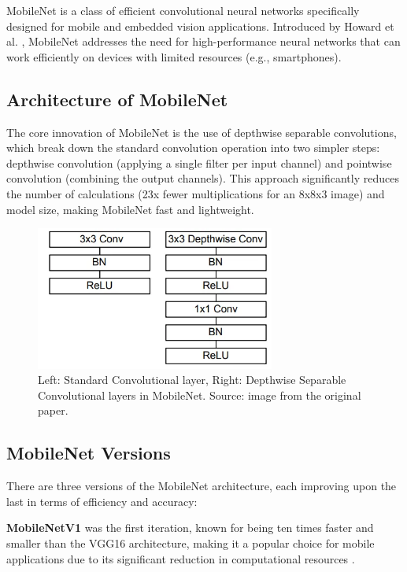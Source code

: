 MobileNet is a class of efficient convolutional neural networks specifically designed for mobile and embedded vision applications. Introduced by Howard et al. \cite{howard_mobilenet}, MobileNet addresses the need for high-performance neural networks that can work efficiently on devices with limited resources (e.g., smartphones).

\subsection{Architecture of MobileNet}

The core innovation of MobileNet is the use of depthwise separable convolutions, which break down the standard convolution operation into two simpler steps: depthwise convolution (applying a single filter per input channel) and pointwise convolution (combining the output channels). This approach significantly reduces the number of calculations (23x fewer multiplications for an 8x8x3 image) and model size, making MobileNet fast and lightweight.

\begin{figure}[h]
    \centering
    \includegraphics[width=0.7\textwidth]{img/mobilenet.png}
    \caption{Left: Standard Convolutional layer, Right: Depthwise Separable Convolutional layers in MobileNet. Source: image from the original paper.}
    \label{fig:mobilenet}
\end{figure}

\subsection{MobileNet Versions}

There are three versions of the MobileNet architecture, each improving upon the last in terms of efficiency and accuracy:

\textbf{MobileNetV1} was the first iteration, known for being ten times faster and smaller than the VGG16 architecture, making it a popular choice for mobile applications due to its significant reduction in computational resources \cite{pandrii_mobilenet}.

